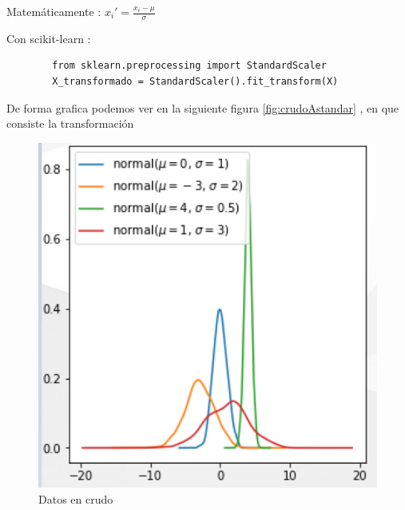 Matemáticamente : $ x_i' = \displaystyle {\frac{x_i - \mu}{\sigma}} $ \medskip

Con scikit-learn : \medskip

\begin{tcolorbox}[colback=gray!30, coltext=black, colframe=black, boxrule=0.5mm, width=\textwidth]
    \begin{verbatim}
        from sklearn.preprocessing import StandardScaler
        X_transformado = StandardScaler().fit_transform(X)
    \end{verbatim}
\end{tcolorbox}

De forma grafica podemos ver en la siguiente figura \ref{fig:crudoAstandar} , en que consiste la transformación

\begin{figure}[h!]
    \centering
    \begin{minipage}{0.45\textwidth}
        \centering
        \includegraphics[width=\linewidth]{Imagenes/StandarCrudo.PNG}
        \caption{Datos en crudo}
        \label{fig:DatosCru}
    \end{minipage}
    \hspace{0.05\textwidth}
    \begin{minipage}{0.45\textwidth}
        \centering

\end{minipage}
\end{figure}

